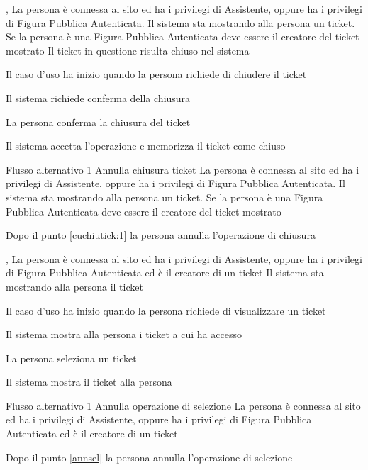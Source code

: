 {, }
{La persona è connessa al sito ed ha i privilegi di Assistente, oppure ha i privilegi di Figura Pubblica Autenticata. Il sistema sta mostrando alla persona un ticket. Se la persona è una Figura Pubblica Autenticata deve essere il creatore del ticket mostrato}
{Il ticket in questione risulta chiuso nel sistema}
{\begin{enumCU}
	\item Il caso d'uso ha inizio quando la persona richiede di chiudere il ticket\label{cuchiutick:0}
	\item Il sistema richiede conferma della chiusura\label{cuchiutick:1}
	\item La persona conferma la chiusura del ticket
	\item Il sistema accetta l'operazione e memorizza il ticket come chiuso
\end{enumCU}}
%
{Flusso alternativo 1}%
{Annulla chiusura ticket}%
{La persona è connessa al sito ed ha i privilegi di Assistente, oppure ha i privilegi di Figura Pubblica Autenticata. Il sistema sta mostrando alla persona un ticket. Se la persona è una Figura Pubblica Autenticata deve essere il creatore del ticket mostrato}%
{\postNulle}%
{\begin{enumCU}
		\item Dopo il punto \ref{cuchiutick:1} la persona annulla l'operazione di chiusura
	\end{enumCU}}%


{, }
{La persona è connessa al sito ed ha i privilegi di Assistente, oppure ha i privilegi di Figura Pubblica Autenticata ed è il creatore di un ticket}
{Il sistema sta mostrando alla persona il ticket}
{\begin{enumCU}
	\item Il caso d'uso ha inizio quando la persona richiede di visualizzare un ticket
	\item Il sistema mostra alla persona i ticket a cui ha accesso\label{annsel}
	\item La persona seleziona un ticket
	\item Il sistema mostra il ticket alla persona
\end{enumCU}
}
%	
{Flusso alternativo 1}%
{Annulla operazione di selezione}%
{La persona è connessa al sito ed ha i privilegi di Assistente, oppure ha i privilegi di Figura Pubblica Autenticata ed è il creatore di un ticket}%
{\postNulle}%
{\begin{enumCU}
		\item Dopo il punto \ref{annsel} la persona annulla l'operazione di selezione
\end{enumCU}}%


